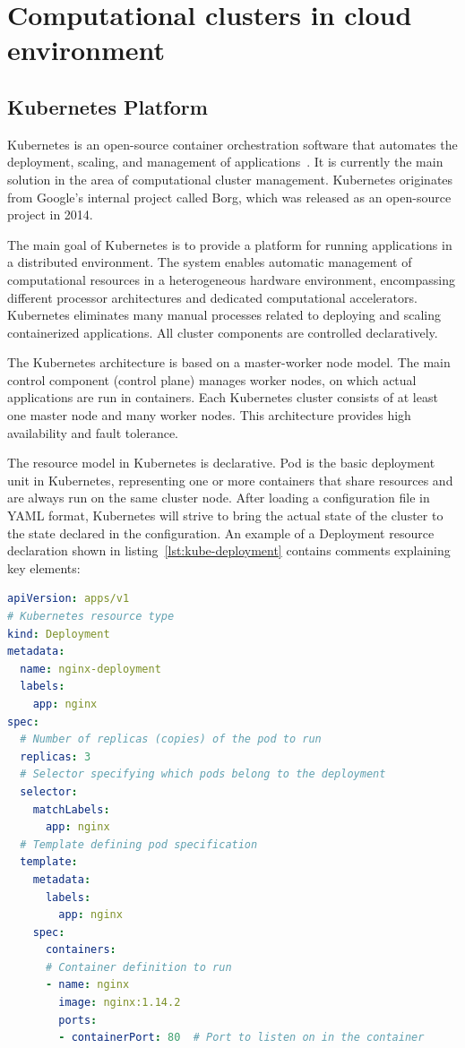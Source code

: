 \section{Computational clusters in cloud environment}

\subsection{Kubernetes Platform}

Kubernetes is an open-source container orchestration software that automates the deployment, scaling, and management of applications~\cite{kubernetes}.
It is currently the main solution in the area of computational cluster management.
Kubernetes originates from Google's internal project called Borg, which was released as an open-source project in 2014.

The main goal of Kubernetes is to provide a platform for running applications in a distributed environment.
The system enables automatic management of computational resources in a heterogeneous hardware environment, encompassing different processor architectures and dedicated computational accelerators.
Kubernetes eliminates many manual processes related to deploying and scaling containerized applications.
All cluster components are controlled declaratively.

The Kubernetes architecture is based on a master-worker node model.
The main control component (control plane) manages worker nodes, on which actual applications are run in containers.
Each Kubernetes cluster consists of at least one master node and many worker nodes.
This architecture provides high availability and fault tolerance.

The resource model in Kubernetes is declarative.
Pod is the basic deployment unit in Kubernetes, representing one or more containers that share resources and are always run on the same cluster node.
After loading a configuration file in YAML format, Kubernetes will strive to bring the actual state of the cluster to the state declared in the configuration.
An example of a Deployment resource declaration shown in listing~\ref{lst:kube-deployment} contains comments explaining key elements:

\begin{lstlisting}[language=yaml,caption={Example Deployment declaration in Kubernetes},label={lst:kube-deployment}]
apiVersion: apps/v1
# Kubernetes resource type
kind: Deployment 
metadata:
  name: nginx-deployment
  labels:
    app: nginx
spec:
  # Number of replicas (copies) of the pod to run
  replicas: 3
  # Selector specifying which pods belong to the deployment
  selector:
    matchLabels:
      app: nginx
  # Template defining pod specification
  template:
    metadata:
      labels:
        app: nginx
    spec:
      containers:
      # Container definition to run
      - name: nginx
        image: nginx:1.14.2
        ports:
        - containerPort: 80  # Port to listen on in the container
\end{lstlisting}

